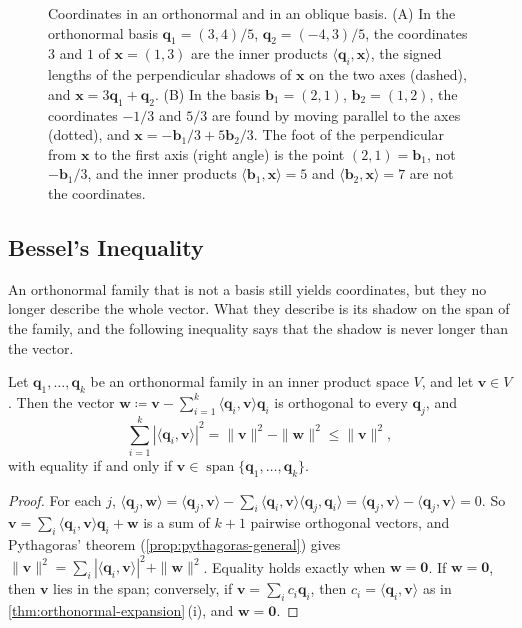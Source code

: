 \begin{figure}
{\begin{tikzpicture}[scale=0.95, font=\scriptsize]
\end{tikzpicture}}
\caption{Coordinates in an orthonormal and in an oblique basis. (A) In the orthonormal basis $\mathbf q_1=(3,4)/5$, $\mathbf q_2=(-4,3)/5$, the coordinates $3$ and $1$ of $\mathbf x=(1,3)$ are the inner products $\langle\mathbf q_i,\mathbf x\rangle$, the signed lengths of the perpendicular shadows of $\mathbf x$ on the two axes (dashed), and $\mathbf x=3\mathbf q_1+\mathbf q_2$. (B) In the basis $\mathbf b_1=(2,1)$, $\mathbf b_2=(1,2)$, the coordinates $-1/3$ and $5/3$ are found by moving parallel to the axes (dotted), and $\mathbf x=-\mathbf b_1/3+5\mathbf b_2/3$. The foot of the perpendicular from $\mathbf x$ to the first axis (right angle) is the point $(2,1)=\mathbf b_1$, not $-\mathbf b_1/3$, and the inner products $\langle\mathbf b_1,\mathbf x\rangle=5$ and $\langle\mathbf b_2,\mathbf x\rangle=7$ are not the coordinates.\label{fig:orthonormal-coordinates}}
\end{figure}

\subsection{Bessel's Inequality}

An orthonormal family that is not a basis still yields coordinates, but they no longer describe the whole vector. What they describe is its shadow on the span of the family, and the following inequality says that the shadow is never longer than the vector.

\begin{theorem}
\label{thm:bessel}
Let $\mathbf q_1,\ldots,\mathbf q_k$ be an orthonormal family in an inner product space $V$, and let $\mathbf v\in V$. Then the vector $\mathbf w\coloneqq\mathbf v-\sum_{i=1}^k\langle\mathbf q_i,\mathbf v\rangle\mathbf q_i$ is orthogonal to every $\mathbf q_j$, and
\[
\sum_{i=1}^k|\langle\mathbf q_i,\mathbf v\rangle|^2=\|\mathbf v\|^2-\|\mathbf w\|^2\le\|\mathbf v\|^2,
\]
with equality if and only if $\mathbf v\in\operatorname{span}\{\mathbf q_1,\ldots,\mathbf q_k\}$.
\end{theorem}

\begin{proof}
For each $j$, $\langle\mathbf q_j,\mathbf w\rangle=\langle\mathbf q_j,\mathbf v\rangle-\sum_i\langle\mathbf q_i,\mathbf v\rangle\langle\mathbf q_j,\mathbf q_i\rangle=\langle\mathbf q_j,\mathbf v\rangle-\langle\mathbf q_j,\mathbf v\rangle=0$. So $\mathbf v=\sum_i\langle\mathbf q_i,\mathbf v\rangle\mathbf q_i+\mathbf w$ is a sum of $k+1$ pairwise orthogonal vectors, and Pythagoras' theorem (\cref{prop:pythagoras-general}) gives $\|\mathbf v\|^2=\sum_i|\langle\mathbf q_i,\mathbf v\rangle|^2+\|\mathbf w\|^2$. Equality holds exactly when $\mathbf w=\mathbf 0$. If $\mathbf w=\mathbf 0$, then $\mathbf v$ lies in the span; conversely, if $\mathbf v=\sum_ic_i\mathbf q_i$, then $c_i=\langle\mathbf q_i,\mathbf v\rangle$ as in \cref{thm:orthonormal-expansion}\,(i), and $\mathbf w=\mathbf 0$.
\end{proof}


